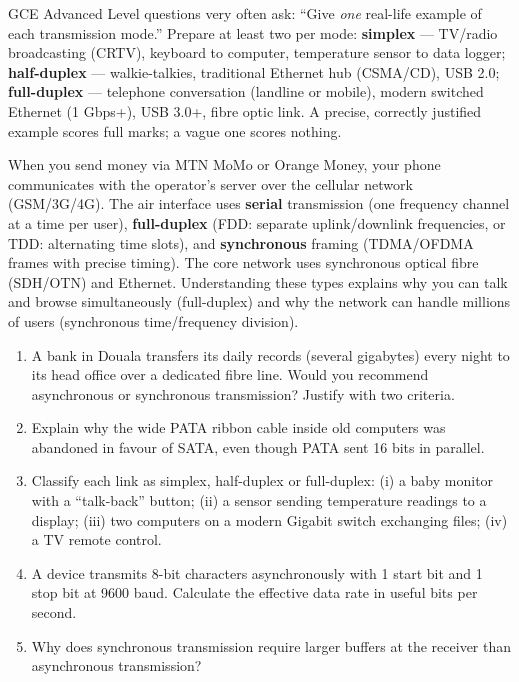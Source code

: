 \documentclass[11pt]{article}
\begin{document}
\begin{savaistu}
GCE Advanced Level questions very often ask: ``Give \emph{one} real-life example of each transmission mode.'' Prepare at least two per mode: \textbf{simplex} --- TV/radio broadcasting (CRTV), keyboard to computer, temperature sensor to data logger; \textbf{half-duplex} --- walkie-talkies, traditional Ethernet hub (CSMA/CD), USB 2.0; \textbf{full-duplex} --- telephone conversation (landline or mobile), modern switched Ethernet (1 Gbps+), USB 3.0+, fibre optic link. A precise, correctly justified example scores full marks; a vague one scores nothing.
\end{savaistu}

\begin{savaistu}
When you send money via MTN MoMo or Orange Money, your phone communicates with the operator's server over the cellular network (GSM/3G/4G). The air interface uses \textbf{serial} transmission (one frequency channel at a time per user), \textbf{full-duplex} (FDD: separate uplink/downlink frequencies, or TDD: alternating time slots), and \textbf{synchronous} framing (TDMA/OFDMA frames with precise timing). The core network uses synchronous optical fibre (SDH/OTN) and Ethernet. Understanding these types explains why you can talk and browse simultaneously (full-duplex) and why the network can handle millions of users (synchronous time/frequency division).
\end{savaistu}

\begin{exercice}[Practice]
\begin{enumerate}
\item A bank in Douala transfers its daily records (several gigabytes) every night to its head office over a dedicated fibre line. Would you recommend asynchronous or synchronous transmission? Justify with two criteria.
\item Explain why the wide PATA ribbon cable inside old computers was abandoned in favour of SATA, even though PATA sent 16 bits in parallel.
\item Classify each link as simplex, half-duplex or full-duplex: (i) a baby monitor with a ``talk-back'' button; (ii) a sensor sending temperature readings to a display; (iii) two computers on a modern Gigabit switch exchanging files; (iv) a TV remote control.
\item A device transmits 8-bit characters asynchronously with 1 start bit and 1 stop bit at 9600 baud. Calculate the effective data rate in useful bits per second.
\item Why does synchronous transmission require larger buffers at the receiver than asynchronous transmission?
\end{enumerate}
\end{exercice}
\end{document}
